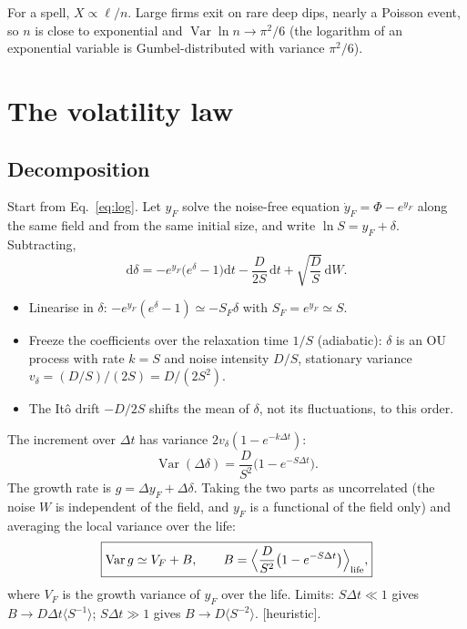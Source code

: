 \documentclass[11pt]{article}
\newcommand{\Var}{\operatorname{Var}}
\newcommand{\dd}{\mathrm d}
\newcommand{\heur}{\textsf{\small[heuristic]}}
\begin{document}
For a spell, $X\propto\ell/n$.  Large firms exit on rare deep dips, nearly a Poisson event, so $n$ is close to exponential and
$\Var\ln n\to\pi^2/6$ (the logarithm of an exponential variable is Gumbel-distributed with variance $\pi^2/6$).

\section{The volatility law}
\label{sec:law}

\subsection{Decomposition}

Start from Eq.~\eqref{eq:log}.  Let $y_F$ solve the noise-free equation $\dot y_F=\Phi-e^{y_F}$ along the same field and from
the same initial size, and write $\ln S=y_F+\delta$.  Subtracting,
\begin{equation}
\dd\delta=-e^{y_F}\big(e^{\delta}-1\big)\dd t-\frac{D}{2S}\,\dd t+\sqrt{\frac DS}\,\dd W .
\end{equation}
\begin{itemize}
\item Linearise in $\delta$: $-e^{y_F}(e^\delta-1)\simeq-S_F\delta$ with $S_F=e^{y_F}\simeq S$.
\item Freeze the coefficients over the relaxation time $1/S$ (adiabatic): $\delta$ is an OU process with rate $k=S$ and noise
  intensity $D/S$, stationary variance $v_\delta=(D/S)/(2S)=D/(2S^2)$.
\item The It\^o drift $-D/2S$ shifts the mean of $\delta$, not its fluctuations, to this order.
\end{itemize}
The increment over $\Delta t$ has variance $2v_\delta(1-e^{-k\Delta t})$:
\begin{equation}
\Var(\Delta\delta)=\frac{D}{S^2}\big(1-e^{-S\Delta t}\big).
\end{equation}
The growth rate is $g=\Delta y_F+\Delta\delta$.  Taking the two parts as uncorrelated (the noise $W$ is independent of the field,
and $y_F$ is a functional of the field only) and averaging the local variance over the life:
\begin{equation}
\boxed{\Var g\simeq V_F+B,\qquad B=\Big\langle\frac D{S^2}\big(1-e^{-S\Delta t}\big)\Big\rangle_{\rm life},}
\end{equation}
where $V_F$ is the growth variance of $y_F$ over the life.  Limits: $S\Delta t\ll1$ gives $B\to D\Delta t\langle S^{-1}\rangle$; $S\Delta t\gg1$ gives
$B\to D\langle S^{-2}\rangle$.  \heur.
\end{document}
